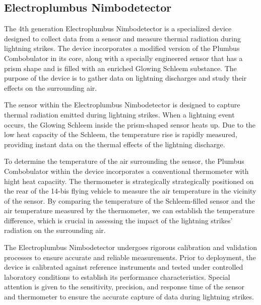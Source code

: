 \documentclass[english]{cenarticle}
\begin{document}
  \subsection{Electroplumbus Nimbodetector}

  The 4th generation Electroplumbus Nimbodetector is a specialized device designed to collect data from a sensor and measure thermal radiation during lightning strikes. The device incorporates a modified version of the Plumbus Combobulator in its core, along with a specially engineered sensor that has a prism shape and is filled with an enriched Glowing Schleem substance. The purpose of the device is to gather data on lightning discharges and study their effects on the surrounding air.\par
  The sensor within the Electroplumbus Nimbodetector is designed to capture thermal radiation emitted during lightning strikes. When a lightning event occurs, the Glowing Schleem inside the prism-shaped sensor heats up. Due to the low heat capacity of the Schleem, the temperature rise is rapidly measured, providing instant data on the thermal effects of the lightning discharge.\par
  To determine the temperature of the air surrounding the sensor, the Plumbus Combobulator within the device incorporates a conventional thermometer with hight heat capaciity. The thermometer is strategically strategically positioned on the rear of the 14-bis flying vehicle to measure the air temperature in the vicinity of the sensor. By comparing the temperature of the Schleem-filled sensor and the air temperature measured by the thermometer, we can establish the temperature difference, which is crucial in assessing the impact of the lightning strikes' radiation on the surrounding air.\par
  The Electroplumbus Nimbodetector undergoes rigorous calibration and validation processes to ensure accurate and reliable measurements. Prior to deployment, the device is calibrated against reference instruments and tested under controlled laboratory conditions to establish its performance characteristics. Special attention is given to the sensitivity, precision, and response time of the sensor and thermometer to ensure the accurate capture of data during lightning strikes.
\end{document}
